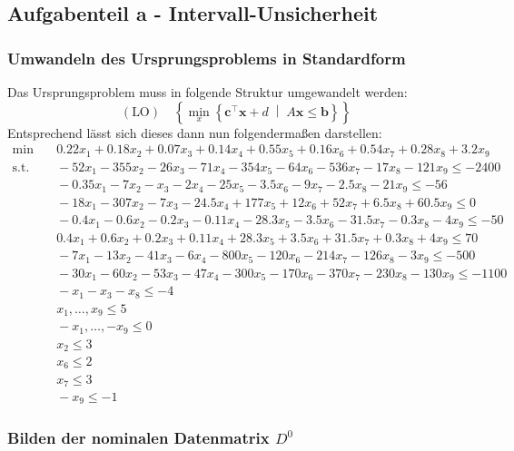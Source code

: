 \documentclass[a4paper,12pt]{article}
\begin{document}
\subsection*{Aufgabenteil a - Intervall-Unsicherheit}

\subsubsection*{Umwandeln des Ursprungsproblems in Standardform}

Das Ursprungsproblem muss in folgende Struktur umgewandelt werden:
\[
(\text{LO}) \quad \left\{ \min_{x} \left\{ \mathbf{c}^\top \mathbf{x} + d \; \middle| \; A\mathbf{x} \leq \mathbf{b} \right\} \right\}
\]
Entsprechend l\"asst sich dieses dann nun folgenderma\ss en darstellen:
\[
\begin{aligned}
    \min & \quad 0.22x_1 + 0.18x_2 + 0.07x_3 + 0.14x_4 + 0.55x_5 + 0.16x_6 + 0.54x_7 + 0.28x_8 + 3.2x_9 \\
    \text{s.t.} & \quad -52x_1 - 355x_2 - 26x_3 - 71x_4 - 354x_5 - 64x_6 - 536x_7 - 17x_8 - 121x_9 \leq -2400 \\
    & \quad -0.35x_1 - 7x_2 - x_3 - 2x_4 - 25x_5 - 3.5x_6 - 9x_7 - 2.5x_8 - 21x_9 \leq -56 \\
    & \quad -18x_1 - 307x_2 - 7x_3 - 24.5x_4 + 177x_5 + 12x_6 + 52x_7 + 6.5x_8 + 60.5x_9 \leq 0 \\
    & \quad -0.4x_1 - 0.6x_2 - 0.2x_3 - 0.11x_4 - 28.3x_5 - 3.5x_6 - 31.5x_7 - 0.3x_8 - 4x_9 \leq -50 \\
    & \quad 0.4x_1 + 0.6x_2 + 0.2x_3 + 0.11x_4 + 28.3x_5 + 3.5x_6 + 31.5x_7 + 0.3x_8 + 4x_9 \leq 70 & \\
    & \quad -7x_1 - 13x_2 - 41x_3 - 6x_4 - 800x_5 - 120x_6 - 214x_7 - 126x_8 - 3x_9 \leq -500 \\
    & \quad -30x_1 - 60x_2 - 53x_3 - 47x_4 - 300x_5 - 170x_6 - 370x_7 - 230x_8 - 130x_9 \leq -1100 \\
    & \quad -x_1 - x_3 - x_8 \leq -4 \\
    & \quad x_1, \dots, x_9 \leq 5 \\
    & \quad - x_1, \dots, - x_9 \leq 0 \\
    & \quad x_2 \leq 3 \\
    & \quad x_6 \leq 2 \\
    & \quad x_7 \leq 3 \\
    & \quad - x_9 \leq - 1
\end{aligned}
\]

\subsubsection*{Bilden der nominalen Datenmatrix $D^0$}
\end{document}
